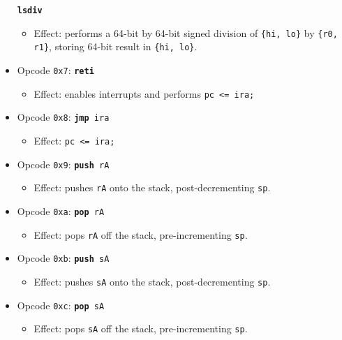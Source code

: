 \documentclass{article}
\begin{document}
\begin{itemize}
			\texttt{\textbf{lsdiv}}
		\begin{itemize}
			\item Effect:  performs a 64-bit by 64-bit signed division of
			\texttt{\{hi, lo\}} by \texttt{\{r0, r1\}}, storing 64-bit result in
			\texttt{\{hi, lo\}}.
		\end{itemize}
		\item Opcode \texttt{0x7}:
			\texttt{\textbf{reti}}
		\begin{itemize}
			\item Effect:  enables interrupts and performs
			\texttt{pc <= ira;}
		\end{itemize}
		\item Opcode \texttt{0x8}:
			\texttt{\textbf{jmp} ira}
		\begin{itemize}
			\item Effect:  \texttt{pc <= ira;}
		\end{itemize}
		\item Opcode \texttt{0x9}:
			\texttt{\textbf{push} rA}
		\begin{itemize}
			\item Effect:  pushes \texttt{rA} onto the stack,
			post-decrementing \texttt{sp}.
		\end{itemize}
		\item Opcode \texttt{0xa}:
			\texttt{\textbf{pop} rA}
		\begin{itemize}
			\item Effect:  pops \texttt{rA} off the stack,
			pre-incrementing \texttt{sp}.
		\end{itemize}
		\item Opcode \texttt{0xb}:
			\texttt{\textbf{push} sA}
		\begin{itemize}
			\item Effect:  pushes \texttt{sA} onto the stack,
			post-decrementing \texttt{sp}.
		\end{itemize}
		\item Opcode \texttt{0xc}:
			\texttt{\textbf{pop} sA}
		\begin{itemize}
			\item Effect:  pops \texttt{sA} off the stack,
			pre-incrementing \texttt{sp}.
		\end{itemize}
	\end{itemize}
	\doublespacing

\end{document}
